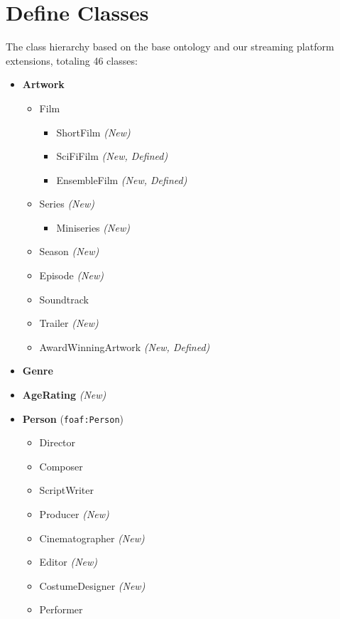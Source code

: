 \chapter{Define Classes}
The class hierarchy based on the base ontology and our streaming platform extensions, totaling 46 classes:

\begin{itemize}
    \item \textbf{Artwork}
    \begin{itemize}
        \item Film
        \begin{itemize}
            \item ShortFilm \textit{(New)}
            \item SciFiFilm \textit{(New, Defined)}
            \item EnsembleFilm \textit{(New, Defined)}
        \end{itemize}
        \item Series \textit{(New)}
        \begin{itemize}
            \item Miniseries \textit{(New)}
        \end{itemize}
        \item Season \textit{(New)}
        \item Episode \textit{(New)}
        \item Soundtrack
        \item Trailer \textit{(New)}
        \item AwardWinningArtwork \textit{(New, Defined)}
    \end{itemize}
    \item \textbf{Genre}
    \item \textbf{AgeRating} \textit{(New)}
    \item \textbf{Person} (\texttt{foaf:Person})
    \begin{itemize}
        \item Director
        \item Composer
        \item ScriptWriter
        \item Producer \textit{(New)}
        \item Cinematographer \textit{(New)}
        \item Editor \textit{(New)}
        \item CostumeDesigner \textit{(New)}
        \item Performer
        \begin{itemize}

\end{itemize}
\end{itemize}
\end{itemize}
